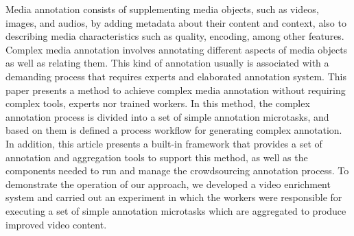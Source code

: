 Media annotation consists of supplementing media objects, such as videos, images, and audios, by adding metadata about their content and context, also to describing media characteristics such as quality, encoding, among other features. Complex media annotation involves annotating different aspects of media objects as well as relating them. This kind of annotation usually is associated with a demanding process that requires experts and elaborated annotation system. This paper presents a method to achieve complex media annotation without requiring complex tools, experts nor trained workers. In this method, the complex annotation process is divided into a set of simple annotation microtasks, and based on them is defined a process workflow for generating complex annotation. In addition, this article presents a built-in framework that provides a set of annotation and aggregation tools to support this method, as well as the components needed to run and manage the crowdsourcing annotation process. To demonstrate the operation of our approach, we developed a video enrichment system and carried out an experiment in which the workers were responsible for executing a set of simple annotation microtasks which are aggregated to produce improved video content.